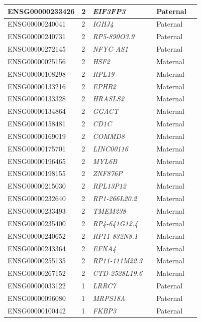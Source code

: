 \begin{table}
\begin{adjustbox}{width={\textwidth}}
\begin{tabular}{@{}p{4cm}p{3cm}p{3cm}p{3cm}p{3cm}p{3cm}@{}}
ENSG00000233426 & 2 & \emph{EIF3FP3} & &  Paternal &   \\ \hline
ENSG00000240041 & 2 & \emph{IGHJ4} & &  Paternal &   \\ \hline
ENSG00000240731 & 2 & \emph{RP5-890O3.9} & &  Paternal &   \\ \hline
ENSG00000272145 & 2 & \emph{NFYC-AS1} & &  Paternal &   \\ \hline
ENSG00000025156 & 2 & \emph{HSF2} & &  Maternal &   \\ \hline
ENSG00000108298 & 2 & \emph{RPL19} & &  Maternal &   \\ \hline
ENSG00000133216 & 2 & \emph{EPHB2} & &  Maternal &   \\ \hline
ENSG00000133328 & 2 & \emph{HRASLS2} & &  Maternal &   \\ \hline
ENSG00000134864 & 2 & \emph{GGACT} & &  Maternal &   \\ \hline
ENSG00000158481 & 2 & \emph{CD1C} & &  Maternal &   \\ \hline
ENSG00000169019 & 2 & \emph{COMMD8} & &  Maternal &   \\ \hline
ENSG00000175701 & 2 & \emph{LINC00116} & &  Maternal &   \\ \hline
ENSG00000196465 & 2 & \emph{MYL6B} & &  Maternal &   \\ \hline
ENSG00000198155 & 2 & \emph{ZNF876P} & &  Maternal &   \\ \hline
ENSG00000215030 & 2 & \emph{RPL13P12} & &  Maternal &   \\ \hline
ENSG00000232640 & 2 & \emph{RP1-266L20.2} & &  Maternal &   \\ \hline
ENSG00000233493 & 2 & \emph{TMEM238} & &  Maternal &   \\ \hline
ENSG00000235400 & 2 & \emph{RP4-641G12.4} & &  Maternal &   \\ \hline
ENSG00000240652 & 2 & \emph{RP11-832N8.1} & &  Maternal &   \\ \hline
ENSG00000243364 & 2 & \emph{EFNA4} & &  Maternal &   \\ \hline
ENSG00000255135 & 2 & \emph{RP11-111M22.3} & & Maternal &   \\ \hline
ENSG00000267152 & 2 & \emph{CTD-2528L19.6} & &  Maternal &   \\ \hline
ENSG00000033122 & 1 & \emph{LRRC7} & & Paternal &   \\ \hline
ENSG00000096080 & 1 & \emph{MRPS18A} & &  Paternal &   \\ \hline
ENSG00000100442 & 1 & \emph{FKBP3} & &  Paternal &   \\ \hline

\end{tabular}
\end{adjustbox}
\end{table}
